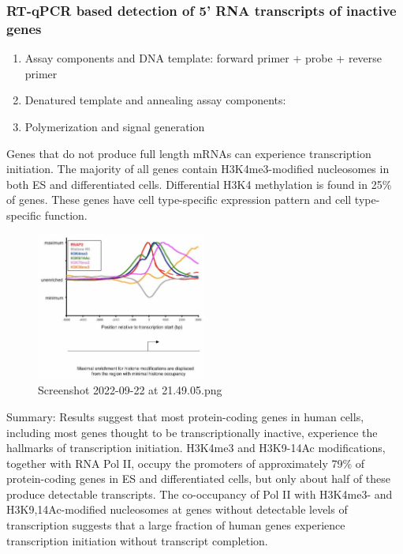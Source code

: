 \hypertarget{rt-qpcr-based-detection-of-5-rna-transcripts-of-inactive-genes}{%
\subsubsection{RT-qPCR based detection of 5' RNA transcripts of inactive genes}\label{rt-qpcr-based-detection-of-5-rna-transcripts-of-inactive-genes}}

\begin{enumerate}
\def\labelenumi{\arabic{enumi}.}
\tightlist
\item
  Assay components and DNA template: forward primer + probe + reverse primer
\item
  Denatured template and annealing assay components:
\item
  Polymerization and signal generation
\end{enumerate}

Genes that do not produce full length mRNAs can experience transcription initiation. The majority of all genes contain H3K4me3-modified nucleosomes in both ES and differentiated cells. Differential H3K4 methylation is found in 25\% of genes. These genes have cell type-specific expression pattern and cell type-specific function.

\begin{figure}
\centering
\includegraphics[width=0.5\textwidth]{../_resources/Screenshot_2022-09-22_at_21-49-05.png}
\caption{Screenshot 2022-09-22 at 21.49.05.png}
\end{figure}

Summary: Results suggest that most protein-coding genes in human cells, including most genes thought to be transcriptionally inactive, experience the hallmarks of transcription initiation. H3K4me3 and H3K9-14Ac modifications, together with RNA Pol II, occupy the promoters of approximately 79\% of protein-coding genes in ES and differentiated cells, but only about half of these produce detectable transcripts. The co-occupancy of Pol II with H3K4me3- and H3K9,14Ac-modified nucleosomes at genes without detectable levels of transcription suggests that a large fraction of human genes experience transcription initiation without transcript completion.

